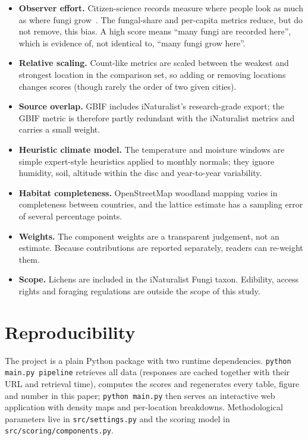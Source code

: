 \documentclass[11pt,a4paper]{article}
\begin{document}
\begin{itemize}
\item \textbf{Observer effort.} Citizen-science records measure where people look as much as where fungi
grow~\cite{isaac}. The fungal-share and per-capita metrics reduce, but do not remove, this bias. A high
score means ``many fungi are recorded here'', which is evidence of, not identical to, ``many fungi grow here''.
\item \textbf{Relative scaling.} Count-like metrics are scaled between the weakest and strongest location in
the comparison set, so adding or removing locations changes scores (though rarely the order of two
given cities).
\item \textbf{Source overlap.} GBIF includes iNaturalist's research-grade export; the GBIF metric is
therefore partly redundant with the iNaturalist metrics and carries a small weight.
\item \textbf{Heuristic climate model.} The temperature and moisture windows are simple expert-style
heuristics applied to monthly normals; they ignore humidity, soil, altitude within the disc and year-to-year
variability.
\item \textbf{Habitat completeness.} OpenStreetMap woodland mapping varies in completeness between
countries, and the lattice estimate has a sampling error of several percentage points.
\item \textbf{Weights.} The component weights are a transparent judgement, not an estimate. Because
contributions are reported separately, readers can re-weight them.
\item \textbf{Scope.} Lichens are included in the iNaturalist Fungi taxon. Edibility, access rights and
foraging regulations are outside the scope of this study.
\end{itemize}

\section{Reproducibility}

\begin{sloppypar}
The project is a plain Python package with two runtime dependencies. \texttt{python main.py pipeline}
retrieves all data (responses are cached together with their URL and retrieval time), computes the scores
and regenerates every table, figure and number in this paper; \texttt{python main.py} then serves an
interactive web application with density maps and per-location breakdowns. Methodological parameters live
in \texttt{src/settings.py} and the scoring model in \texttt{src/scoring/components.py}.
\end{sloppypar}
\end{document}
